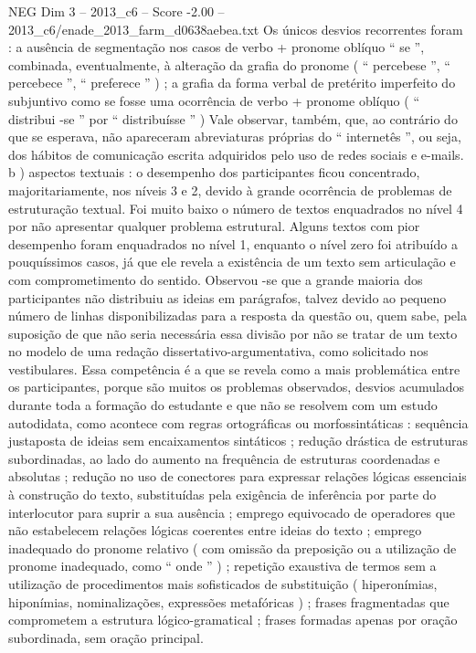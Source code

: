 \begin{textsample}{NEG Dim 3 – 2013\_c6 – Score -2.00 – 2013\_c6/enade\_2013\_farm\_d0638aebea.txt}
Os únicos desvios recorrentes foram : a ausência de segmentação nos casos de verbo + pronome oblíquo “ se ”, combinada, eventualmente, à alteração da grafia do pronome ( “ percebese ”, “ percebece ”, “ preferece ” ) ; a grafia da forma verbal de pretérito imperfeito do subjuntivo como se fosse uma ocorrência de verbo + pronome oblíquo ( “ distribui -se ” por “ distribuísse ” ) Vale observar, também, que, ao contrário do que se esperava, não apareceram abreviaturas próprias do “ internetês ”, ou seja, dos hábitos de comunicação escrita adquiridos pelo uso de redes sociais e e-mails. b ) aspectos textuais : o desempenho dos participantes ficou concentrado, majoritariamente, nos níveis 3 e 2, devido à grande ocorrência de problemas de estruturação textual.
Foi muito baixo o número de textos enquadrados no nível 4 por não apresentar qualquer problema estrutural.
Alguns textos com pior desempenho foram enquadrados no nível 1, enquanto o nível zero foi atribuído a pouquíssimos casos, já que ele revela a existência de um texto sem articulação e com comprometimento do sentido.
Observou -se que a grande maioria dos participantes não distribuiu as ideias em parágrafos, talvez devido ao pequeno número de linhas disponibilizadas para a resposta da questão ou, quem sabe, pela suposição de que não seria necessária essa divisão por não se tratar de um texto no modelo de uma redação dissertativo-argumentativa, como solicitado nos vestibulares.
Essa competência é a que se revela como a mais problemática entre os participantes, porque são muitos os problemas observados, desvios acumulados durante toda a formação do estudante e que não se resolvem com um estudo autodidata, como acontece com regras ortográficas ou morfossintáticas : sequência justaposta de ideias sem encaixamentos sintáticos ; redução drástica de estruturas subordinadas, ao lado do aumento na frequência de estruturas coordenadas e absolutas ; redução no uso de conectores para expressar relações lógicas essenciais à construção do texto, substituídas pela exigência de inferência por parte do interlocutor para suprir a sua ausência ; emprego equivocado de operadores que não estabelecem relações lógicas coerentes entre ideias do texto ; emprego inadequado do pronome relativo ( com omissão da preposição ou a utilização de pronome inadequado, como “ onde ” ) ; repetição exaustiva de termos sem a utilização de procedimentos mais sofisticados de substituição ( hiperonímias, hiponímias, nominalizações, expressões metafóricas ) ; frases fragmentadas que comprometem a estrutura lógico-gramatical ; frases formadas apenas por oração subordinada, sem oração principal.

\end{textsample}
